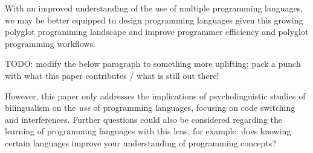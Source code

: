 \documentclass[a4paper,UKenglish,cleveref, autoref]{oasics-v2019}
\begin{document}
With an improved understanding of the use of multiple programming languages, we may be better equipped to design programming languages given this growing polyglot programming landscape and improve programmer efficiency and polyglot programming workflows. 

TODO: modify the below paragraph to something more uplifting: pack a punch with what this paper contributes / what is still out there! 

However, this paper only addresses the implications of psycholinguistic studies of bilingualism on the \textit{use} of programming languages, focusing on code switching and interferences. Further questions could also be considered regarding the learning of programming languages with this lens, for example: does knowing certain languages improve your understanding of programming concepts? 

\appendix


\end{document}
